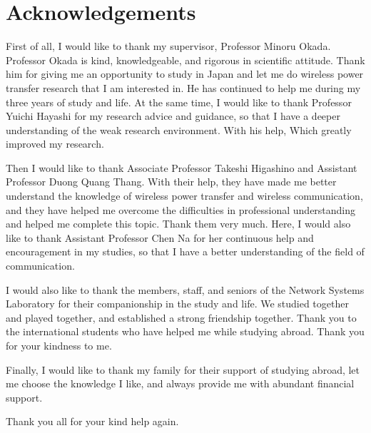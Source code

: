 \chapter*{Acknowledgements}

First of all, I would like to thank my supervisor, Professor Minoru Okada. Professor Okada is kind, knowledgeable, and rigorous in scientific attitude. Thank him for giving me an opportunity to study in Japan and let me do wireless power transfer research that I am interested in. He has continued to help me during my three years of study and life. At the same time, I would like to thank Professor Yuichi Hayashi for my research advice and guidance, so that I have a deeper understanding of the weak research environment. With his help, Which greatly improved my research.

Then I would like to thank Associate Professor Takeshi Higashino and Assistant Professor Duong Quang Thang. With their help, they have made me better understand the knowledge of wireless power transfer and wireless communication, and they have helped me overcome the difficulties in professional understanding and helped me complete this topic. Thank them very much. Here, I would also like to thank Assistant Professor Chen Na for her continuous help and encouragement in my studies, so that I have a better understanding of the field of communication.

I would also like to thank the members, staff, and seniors of the Network Systems Laboratory for their companionship in the study and life. We studied together and played together, and established a strong friendship together. Thank you to the international students who have helped me while studying abroad. Thank you for your kindness to me.

Finally, I would like to thank my family for their support of studying abroad, let me choose the knowledge I like, and always provide me with abundant financial support.

Thank you all for your kind help again.